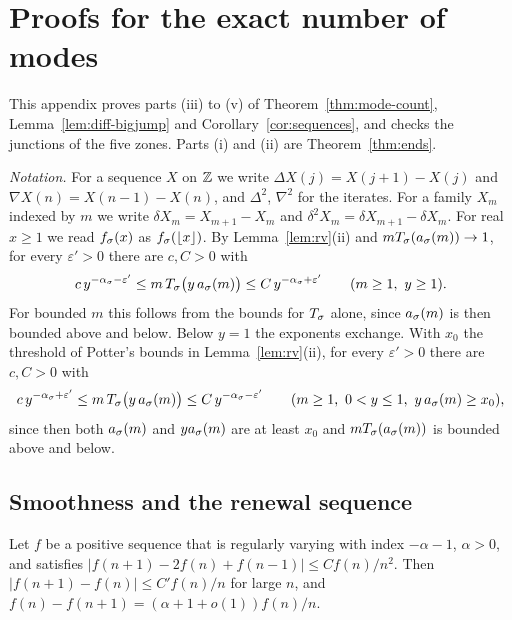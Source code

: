 \section{Proofs for the exact number of modes}\label{app:modes}

This appendix proves parts (iii) to (v) of Theorem~\ref{thm:mode-count},
Lemma~\ref{lem:diff-bigjump} and Corollary~\ref{cor:sequences}, and checks the junctions of the
five zones. Parts (i) and (ii) are Theorem~\ref{thm:ends}.

\emph{Notation.} For a sequence $X$ on $\mathbb{Z}$ we write $\Delta X(j)=X(j+1)-X(j)$ and
$\nabla X(n)=X(n-1)-X(n)$, and $\Delta^2$, $\nabla^2$ for the iterates. For a family $X_m$
indexed by $m$ we write $\delta X_m=X_{m+1}-X_m$ and $\delta^2X_m=\delta X_{m+1}-\delta X_m$.
For real $x\ge1$ we read $f_\sigma(x)$ as $f_\sigma(\lfloor x\rfloor)$. By Lemma~\ref{lem:rv}(ii)
and $mT_\sigma(a_\sigma(m))\to1$, for every $\varepsilon'>0$ there are $c,C>0$ with
\begin{equation}\label{eq:potter-m}
 c\,y^{-\alpha_\sigma-\varepsilon'}\le m\,T_\sigma\bigl(y\,a_\sigma(m)\bigr)\le C\,y^{-\alpha_\sigma+\varepsilon'}
 \qquad(m\ge1,\ y\ge1).
\end{equation}
For bounded $m$ this follows from the bounds for $T_\sigma$ alone, since $a_\sigma(m)$ is then
bounded above and below. Below $y=1$ the exponents exchange. With $x_0$ the threshold of
Potter's bounds in Lemma~\ref{lem:rv}(ii), for every $\varepsilon'>0$ there are $c,C>0$ with
\begin{equation}\label{eq:potter-m-small}
 c\,y^{-\alpha_\sigma+\varepsilon'}\le m\,T_\sigma\bigl(y\,a_\sigma(m)\bigr)\le C\,y^{-\alpha_\sigma-\varepsilon'}
 \qquad(m\ge1,\ 0<y\le1,\ y\,a_\sigma(m)\ge x_0),
\end{equation}
since then both $a_\sigma(m)$ and $ya_\sigma(m)$ are at least $x_0$ and $mT_\sigma(a_\sigma(m))$ is
bounded above and below.

\subsection{Smoothness and the renewal sequence}\label{app:smooth}

\begin{lemma}[consequences of (LD2)]\label{lem:ld2}
Let $f$ be a positive sequence that is regularly varying with index $-\alpha-1$, $\alpha>0$, and
satisfies $|f(n+1)-2f(n)+f(n-1)|\le Cf(n)/n^2$. Then $|f(n+1)-f(n)|\le C'f(n)/n$ for large $n$,
and $f(n)-f(n+1)=(\alpha+1+o(1))f(n)/n$.
\end{lemma}

